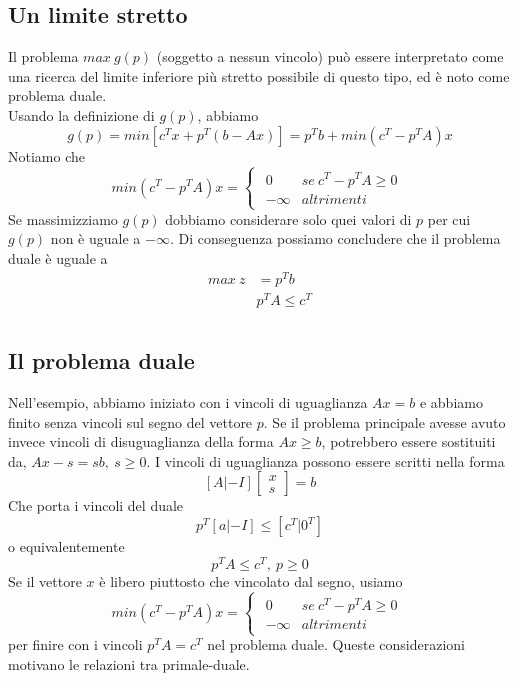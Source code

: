 \documentclass[12pt,a4paper]{article}
\begin{document}
\subsection{Un limite stretto}
Il problema $max \ g(p)$ (soggetto a nessun vincolo) può essere interpretato come una ricerca del limite inferiore più stretto possibile di questo tipo, ed è noto come problema duale.\\
Usando la definizione di $g(p)$, abbiamo
$$g(p)=min[c^Tx+p^T(b-Ax)] = p^Tb+ min(c^T-p^TA)x$$
Notiamo che $$min(c^T-p^TA)x=\begin{cases}
\begin{array}{ll}
0 & se\ c^T-p^TA \geq 0\\
-\infty & altrimenti\end{array}\end{cases}$$
Se massimizziamo $g(p)$ dobbiamo considerare solo quei valori di $p$ per cui $g(p)$ non è uguale a $-\infty$. Di conseguenza possiamo concludere che il problema duale è uguale a 
$$\begin{array}{rl}
max\ z & = p^Tb\\
& p^TA \leq c^T\\
\end{array}$$

\subsection{Il problema duale}
Nell'esempio, abbiamo iniziato con i vincoli di uguaglianza $Ax = b$ e abbiamo finito senza vincoli sul segno del vettore $p$. Se il problema principale avesse avuto invece vincoli di disuguaglianza della forma $Ax \geq b$, potrebbero essere sostituiti da, $Ax-s=s b,\ s \geq 0$. I vincoli di uguaglianza possono essere scritti nella forma
$$[A|-I]\left[\begin{array}{c}x\\s\end{array}\right]=b$$
Che porta i vincoli del duale
$$p^T[a|-I] \leq [c^T|0^T]$$
o equivalentemente
$$p^TA \leq c^T, \ p\geq 0$$
Se il vettore $x$ è libero piuttosto che vincolato dal segno, usiamo 
$$min(c^T-p^TA)x=\begin{cases}
\begin{array}{ll}
0 & se\ c^T-p^TA \geq 0\\
-\infty & altrimenti\end{array}\end{cases}$$
per finire con i vincoli $p^TA = c^T$ nel problema duale. Queste considerazioni motivano le relazioni tra primale-duale.
\end{document}

